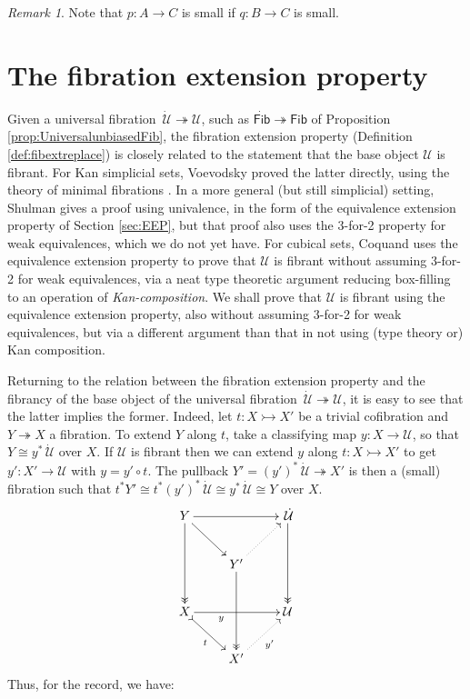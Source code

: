 \documentclass[11pt,reqno]{amsart}
\newcommand{\ra}{\ensuremath{\rightarrow}}
\newcommand{\cof}{\ensuremath{\rightarrowtail}}
\newcommand{\fib}{\ensuremath{\twoheadrightarrow}}
\newcommand{\U}{\ensuremath{\mathcal{U}}}
\newcommand{\UU}{\ensuremath{\,\dot{\mathcal{U}}}}
\newcommand{\Fib}{\ensuremath{\mathsf{Fib}}}
\newcommand{\FFib}{\ensuremath{\dot{\mathsf{Fib}}}}
\theoremstyle{remark}
\newtheorem{remark}[theorem]{Remark}
\theoremstyle{definition}
\begin{document}
\begin{remark}
Note that $p : A \ra C$ is small if $q : B\ra C$ is small.
\end{remark}

\section{The fibration extension property}\label{sec:FEP}

Given a universal fibration $\UU\fib\U$, such as $\FFib\fib\Fib$ of Proposition \ref{prop:UniversalunbiasedFib}, the fibration extension property (Definition \ref{def:fibextreplace}) is closely related to the statement that the base object $\U$ is fibrant.  For Kan simplicial sets, Voevodsky proved the latter directly, using the theory of minimal fibrations \cite{KLV:21}.   In a more general (but still simplicial) setting, Shulman \cite{Shu:15} gives a proof using univalence, in the form of the equivalence extension property of Section \ref{sec:EEP}, but that proof also uses the 3-for-2 property for weak equivalences, which we do not yet have. For cubical sets, Coquand \cite{CCHM:2018ctt} uses the equivalence extension property to prove that $\U$ is fibrant without assuming 3-for-2 for weak equivalences, via a neat type theoretic argument reducing box-filling to an operation of \emph{Kan-composition}.   We shall prove that $\U$ is fibrant using the equivalence extension property, also without assuming 3-for-2 for weak equivalences, but via a different argument than that in \cite{CCHM:2018ctt} not using (type theory or)  Kan composition.

Returning to the relation between the fibration extension property and the fibrancy of the base object of the universal fibration $\UU\fib\U$, it is easy to see that the latter implies the former.  Indeed, let $t : X\cof X'$ be a trivial cofibration and $Y \fib X$ a fibration.  To extend $Y$ along $t$, take a classifying map $y : X \ra \U$, so that $Y \cong y^*\UU$ over $X$. If $\U$ is fibrant then we can extend $y$ along $t : X\cof X'$ to get $y' : X' \ra \U$ with $y = y'\circ t$.  The pullback $Y' = (y')^*\UU \fib X'$ is then a (small) fibration such that $t^*Y' \cong t^*(y')^*\UU\cong y^*\UU \cong Y$ over $X$.  
\[
\xymatrix{
Y \ar@{->>}[dd] \ar[rd] \ar[rr] && \UU \ar@{->>}[dd] \\
& Y' \ar@{->>}[dd] \ar@{..>}[ru] & \\
X  \ar@{>->}[rd]_t \ar[rr]_<<<<<<<<{y}  && \U  \\
& X' \ar@{..>}[ru]_{y'} &
}
\]
Thus, for the record, we have:
\end{document}

